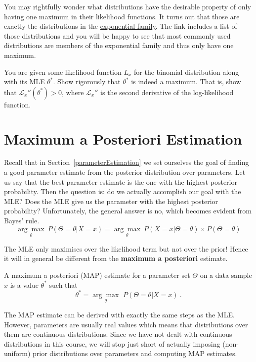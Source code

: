 You may rightfully wonder what distributions have the desirable property of only having one maximum in their likelihood functions. It turns out that those are
exactly the distributions in the \href{https://en.wikipedia.org/wiki/Exponential_family}{exponential family}. The link includes a list of those distributions and
you will be happy to see that most commonly used distributions are members of the exponential family and thus only have one maximum.

\begin{Exercise}
You are given some likelihood function $ L_{x} $ for the binomial distribution along with its MLE $ \theta^{*} $. Show rigorously that $ \theta^{*} $ is indeed
a maximum. That is, show that $ \mathcal{L}_{x}''(\theta^{*}) > 0 $, where $ \mathcal{L}_{x}'' $ is the second derivative of the log-likelihood function.
\end{Exercise}

 
\section{Maximum a Posteriori Estimation}

Recall that in Section~\ref{parameterEstimation} we set ourselves the goal of finding a good parameter estimate from the posterior distribution over parameters.
Let us say that the best parameter estimate is the one with the highest posterior probability. Then the question is: do we actually accomplish our goal with the MLE?
Does the MLE give us the parameter with the highest posterior probability? Unfortunately, the general answer is no, which becomes evident from Bayes' rule.
\begin{equation}
\underset{\theta}{\arg\max}~P(\Theta = \theta| X=x) = \underset{\theta}{\arg\max}~P(X=x|\Theta=\theta) \times P(\Theta = \theta)
\end{equation}

The MLE only maximises over the likelihood term but not over the prior! Hence it will in general be different from the \textbf{maximum a posteriori} estimate.

\begin{Definition}
A maximum a posteriori (MAP) estimate for a parameter set $ \Theta $  on a data sample $ x $ 
is a value $ \theta^{*} $ such that
$$ \theta^{*} = \underset{\theta}{\arg\max}\, \, P(\Theta = \theta| X=x) \ . $$
\end{Definition}

The MAP estimate can be derived with exactly the same steps as the MLE. However, parameters are usually real values which means that distributions over them
are continuous distributions. Since we have not dealt with continuous distributions in this course, we will stop just short of actually imposing
(non-uniform) prior distributions over parameters and computing MAP estimates.

